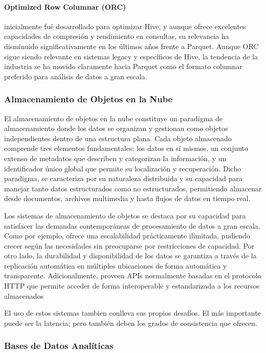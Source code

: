 \newpage
\paragraph{Optimized Row Columnar (ORC)} 
inicialmente fué desarrollado para optimizar Hive, 
y aunque ofrece excelentes capacidades de compresión y rendimiento en consultas, su relevancia 
ha disminuido significativamente en los últimos años frente a Parquet. Aunque ORC sigue siendo 
relevante en sistemas legacy y específicos de Hive, la tendencia de la industria se ha movido 
claramente hacia Parquet como el formato columnar preferido para análisis de datos a gran escala.

\subsubsection{Almacenamiento de Objetos en la Nube}

El almacenamiento de objetos en la nube constituye un paradigma de almacenamiento donde los datos se organizan y gestionan como objetos independientes dentro de una estructura plana.
Cada objeto almacenado comprende tres elementos fundamentales: los datos en sí mismos, un conjunto extenso de metadatos que describen y categorizan la información, 
y un identificador único global que permite su localización y recuperación. 
Dicho paradigma, se caracteriza por su naturaleza distribuida y su capacidad para manejar tanto datos estructurados como no estructurados, 
permitiendo almacenar desde documentos, archivos multimedia y hasta flujos de datos en tiempo real.

Los sistemas de almacenamiento de objetos se destaca por su capacidad para satisfacer las demandas contemporáneas de procesamiento de datos a gran escala.
Como por ejemplo, ofrece una escalabilidad prácticamente ilimitada, pudiendo crecer según las necesidades sin preocuparse por restricciones de capacidad.
Por otro lado, la durabilidad y disponibilidad de los datos se garantiza a través de la replicación automática en múltiples ubicaciones de forma automática y transparente.
Adicionalmente, proveen APIs normalmente basadas en el protocolo HTTP que permite acceder de forma interoperable y estandarizada a los recursos almacenados

El uso de estos sistemas tambien conlleva sus propios desafíos. El más importante puede ser la latencia; pero también deben los grados de consistencia que ofrecen.

\clearpage
\subsubsection{Bases de Datos Analíticas}

